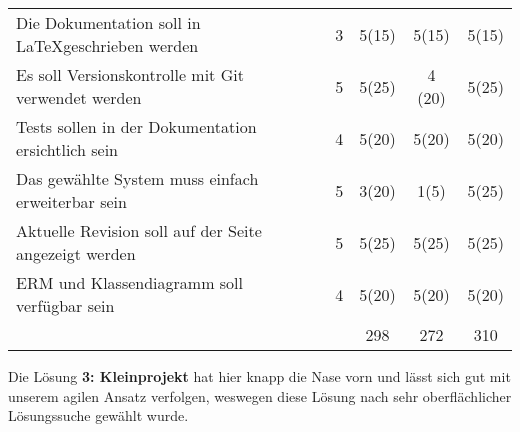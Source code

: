 \begin{longtable}{ p{10cm}|c|c|ccc  }
    Die Dokumentation soll in \LaTeX geschrieben werden & & 3 & 5(15)& 5(15)& 5(15)\\
    Es soll Versionskontrolle mit Git verwendet werden & & 5 & 5(25) &4 (20) &5(25)\\
    Tests sollen in der Dokumentation ersichtlich sein & & 4 & 5(20)& 5(20)& 5(20) \\
    Das gewählte System muss einfach erweiterbar sein & & 5 & 3(20) & 1(5) & 5(25)\\
    Aktuelle Revision soll auf der Seite angezeigt werden & & 5 & 5(25)& 5(25)& 5(25)\\
    ERM und Klassendiagramm soll verfügbar sein & & 4 &5(20)&5(20)&5(20)\\
    \hline
    &&&298&272&310
\end{longtable}

\noindent
Die Lösung \textbf{3: Kleinprojekt} hat hier knapp die Nase vorn und lässt sich gut mit unserem agilen Ansatz verfolgen, weswegen diese Lösung nach sehr oberflächlicher Lösungssuche gewählt wurde.